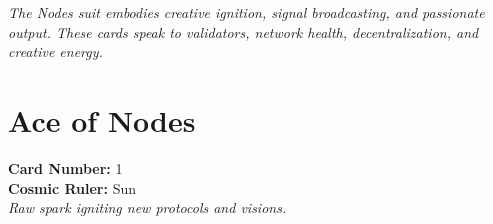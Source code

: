 \documentclass[11pt,oneside]{book}
\begin{document}
\textit{The Nodes suit embodies creative ignition, signal broadcasting, and passionate output. These cards speak to validators, network health, decentralization, and creative energy.}

\newpage
\section*{Ace of Nodes}

\begin{minipage}[t]{0.55\textwidth}
  \vspace{0pt}
  \textbf{Card Number:} 1\\  \textbf{Cosmic Ruler:} Sun\\  \textit{Raw spark igniting new protocols and visions.}
\end{minipage}
\end{document}
